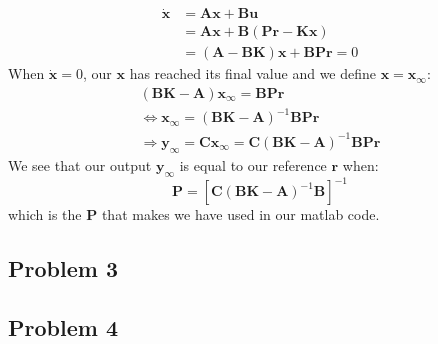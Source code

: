 \begin{align*}
  \dot{\boldsymbol{x}} &= \boldsymbol{Ax} + \boldsymbol{Bu} \\
                       &= \boldsymbol{Ax} +
                         \boldsymbol{B}(\boldsymbol{Pr} -
                         \boldsymbol{Kx}) \\
											 &= (\boldsymbol{A}-\boldsymbol{BK})\boldsymbol{x}
												+ \boldsymbol{BPr} = 0
\end{align*}
When $\boldsymbol{\dot{x}} = 0$, our $\boldsymbol{x}$ has reached its final value and we define $\boldsymbol{x} = \boldsymbol{x_\infty}$:
\begin{align*}
(\boldsymbol{BK} - \boldsymbol{A})\boldsymbol{x_\infty} = \boldsymbol{BPr} \\
\Leftrightarrow \boldsymbol{x_\infty} = (\boldsymbol{BK} - \boldsymbol{A})^{-1}\boldsymbol{BPr} \\
\Rightarrow \boldsymbol{y_\infty} = \boldsymbol{Cx_\infty} = \boldsymbol{C}(\boldsymbol{BK} - \boldsymbol{A})^{-1}\boldsymbol{BPr}
\end{align*}
We see that our output $\boldsymbol{y_\infty}$ is equal to our reference $\boldsymbol{r}$ when:
\begin{equation}
\boldsymbol{P} = [\boldsymbol{C}(\boldsymbol{BK} - \boldsymbol{A})^{-1}\boldsymbol{B}]^{-1}
\end{equation}
which is the $\boldsymbol{P}$ that makes  we have used in our matlab code.
\subsection{Problem 3}
\subsection{Problem 4}
